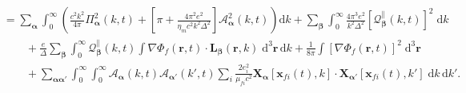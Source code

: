 \documentclass{article}
\begin{document}
\begin{equation}
\begin{split}
&= \sum_{\bm{\alpha}}\int_0^\infty\left(\frac{c^2k^2}{4\pi}\mathit{\Pi}_{\bm{\alpha}}^2(k,t) + \left[\pi + \frac{4\pi^2e^2}{\eta_mc^2k^2\Delta^2}\right]\mathcal{A}_{\bm{\alpha}}^2(k,t)\right)\mathrm{d}k + \sum_{\bm{\beta}}\int_0^\infty\frac{4\pi^3e^2}{k^2\Delta^2}\left[\mathcal{Q}_{\bm{\beta}}^\parallel(k,t)\right]^2\;\mathrm{d}k\\
&\qquad + \frac{e}{\Delta}\sum_{\bm{\beta}}\int_0^\infty\mathcal{Q}_{\bm{\beta}}^\parallel(k,t)\int\nabla\Phi_f(\mathbf{r},t)\cdot\mathbf{L}_{\bm{\beta}}(\mathbf{r},k)\;\mathrm{d}^3\mathbf{r}\,\mathrm{d}k + \frac{1}{8\pi}\int\left[\nabla\Phi_f(\mathbf{r},t)\right]^2\;\mathrm{d}^3\mathbf{r}\\
&\qquad + \sum_{\bm{\alpha}\bm{\alpha}'}\int_0^\infty\int_0^\infty\mathcal{A}_{\bm{\alpha}}(k,t)\mathcal{A}_{\bm{\alpha}'}(k',t)\sum_i\frac{2e_i^2}{\mu_{fi}c^2}\mathbf{X}_{\bm{\alpha}}[\mathbf{x}_{fi}(t),k]\cdot\mathbf{X}_{\bm{\alpha}'}[\mathbf{x}_{fi}(t),k']\;\mathrm{d}k\,\mathrm{d}k'.
\end{split}
\end{equation}
\end{document}
